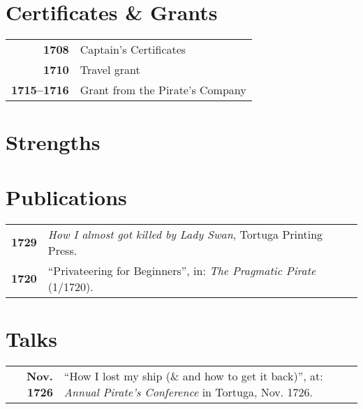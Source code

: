 \documentclass[10pt]{article}
\begin{document}
\begin{minipage}[t]{0.45\textwidth}
\vspace{2em}
\section*{Certificates \& Grants}
\begin{tabular}{>{\footnotesize\bfseries}r >{\footnotesize}p{}}
    1708 & Captain's Certificates \\
    1710 & Travel grant \\
    1715--1716 & Grant from the Pirate's Company
\end{tabular}
\bigskip

\section*{Strengths}

\end{minipage}\hfill
\begin{minipage}[t]{0.5\textwidth}
\vspace{2em}
\section*{Publications}
\begin{tabular}{>{\footnotesize\bfseries}r >{\footnotesize}p{}}
    1729 & \emph{How I almost got killed by Lady Swan}, Tortuga Printing Press. \\
    1720 & ``Privateering for Beginners'', in: \emph{The Pragmatic Pirate} (1/1720).
\end{tabular}
\bigskip

\section*{Talks}
\begin{tabular}{>{\footnotesize\bfseries}r >{\footnotesize}p{}}
    Nov. 1726 & ``How I lost my ship (\& and how to get it back)'', at: \emph{Annual Pirate's Conference} in Tortuga, Nov. 1726.
\end{tabular}
\end{minipage}


\vspace{1em}



\end{document}
